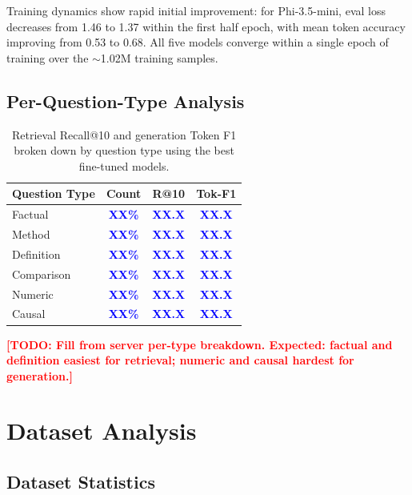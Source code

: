 \documentclass[11pt]{article}
\newcommand{\todo}[1]{\textcolor{red}{\textbf{[TODO: #1]}}}
\newcommand{\placeholder}[1]{\textcolor{blue}{\textbf{#1}}}
\begin{document}
Training dynamics show rapid initial improvement: for Phi-3.5-mini, eval loss decreases from 1.46 to 1.37 within the first half epoch, with mean token accuracy improving from 0.53 to 0.68. All five models converge within a single epoch of training over the $\sim$1.02M training samples.

\subsection{Per-Question-Type Analysis}
\label{sec:per_type}

\begin{table}[t]
\caption{Retrieval Recall@10 and generation Token F1 broken down by question type using the best fine-tuned models.}
\label{tab:per_type}
\centering
\small
\begin{tabular}{lccc}
\toprule
\textbf{Question Type} & \textbf{Count} & \textbf{R@10} & \textbf{Tok-F1} \\
\midrule
Factual & \placeholder{XX\%} & \placeholder{XX.X} & \placeholder{XX.X} \\
Method & \placeholder{XX\%} & \placeholder{XX.X} & \placeholder{XX.X} \\
Definition & \placeholder{XX\%} & \placeholder{XX.X} & \placeholder{XX.X} \\
Comparison & \placeholder{XX\%} & \placeholder{XX.X} & \placeholder{XX.X} \\
Numeric & \placeholder{XX\%} & \placeholder{XX.X} & \placeholder{XX.X} \\
Causal & \placeholder{XX\%} & \placeholder{XX.X} & \placeholder{XX.X} \\
\bottomrule
\end{tabular}
\end{table}

\todo{Fill from server per-type breakdown. Expected: factual and definition easiest for retrieval; numeric and causal hardest for generation.}

\section{Dataset Analysis}
\label{sec:analysis}

\subsection{Dataset Statistics}
\end{document}
